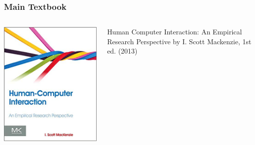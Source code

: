 \documentclass{beamer}
\begin{document}
\begin{frame}
\frametitle{Main Textbook}

\begin{columns}[c] %

\includegraphics[width=0.9\linewidth]{mackenzie}

Human Computer Interaction: An Empirical Research Perspective by I. Scott Mackenzie, 1st ed. (2013)
\end{columns}


\end{frame}
\end{document}
